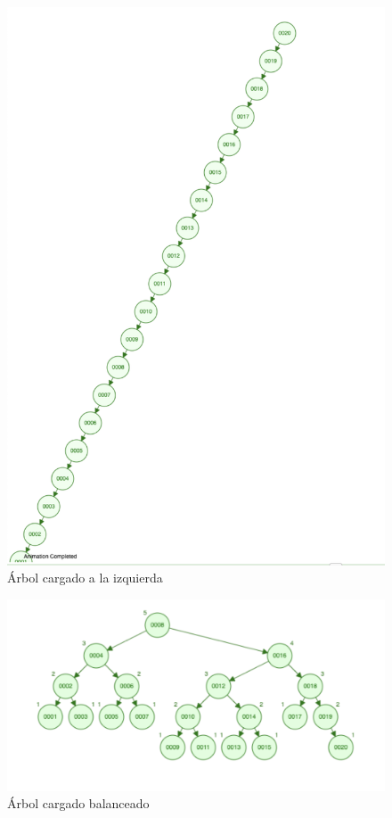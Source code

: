 \documentclass[a4paper,12pt]{article}
\begin{document}
\center
\begin{figure}[h]
\includegraphics[scale=.5]{arbol1}
\caption{Árbol cargado a la izquierda}
\end{figure}

\center
\begin{figure}[h]
\includegraphics[scale=.5]{arbol2}
\caption{Árbol cargado balanceado}
\end{figure}
\end{document}
